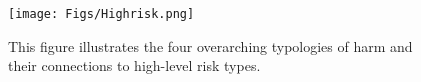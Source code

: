 \vspace{-8pt}
\begin{figure}[h!]
    \centering
    \texttt{[image: Figs/Highrisk.png]}
    \caption[]{This figure illustrates the four overarching typologies of harm and their connections to high-level risk types.\vspace{-0.5cm}}
    \label{fig:1}
\end{figure}



\vspace{-2pt}
